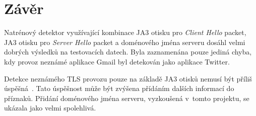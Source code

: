 
\section{Závěr}
\label{sec_conclusion}

Natrénový detektor využívající kombinace JA3 otisku pro \textit{Client Hello} packet, JA3 otisku pro \textit{Server Hello} packet a doménového jména serveru dosáhl velmi dobrých výsledků na testovacích datech. Byla zaznamenána pouze jediná chyba, kdy provoz neznámé aplikace Gmail byl detekován jako aplikace Twitter.

Detekce neznámého TLS provozu pouze na základě JA3 otisků nemusí být příliš úspěšná~\cite{bib_matousek}. Tato úspěšnost může být zvýšena přídáním dalších informací do příznaků. Přidání doménového jména serveru, vyzkoušená v~tomto projektu, se ukázala jako velmi spolehlivá.

